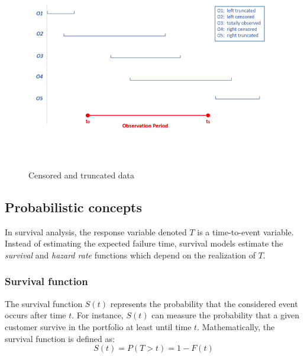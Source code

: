 \documentclass[
]{book}
\begin{document}
\begin{figure}

{\centering \includegraphics[width=500pt,height=250pt]{./imgs/censoring_and_truncation} 

}

\caption{Censored and truncated data}\label{fig:censoring}
\end{figure}

\hypertarget{probabilistic-concepts}{%
\subsection{Probabilistic concepts}\label{probabilistic-concepts}}

In survival analysis, the response variable denoted \(T\) is a time-to-event variable. Instead of estimating the expected failure time, survival models estimate the \emph{survival} and \emph{hazard rate} functions which depend on the realization of \(T\).

\hypertarget{survival-function}{%
\subsubsection*{Survival function}\label{survival-function}}

The survival function \(S(t)\) represents the probability that the considered event occurs after time \(t\). For instance, \(S(t)\) can measure the probability that a given customer survive in the portfolio at least until time \(t\). Mathematically, the survival function is defined as:
\begin{equation}
  S(t) = P(T > t) = 1 - F(t)
  \label{eq:survfun}
\end{equation}
\end{document}
